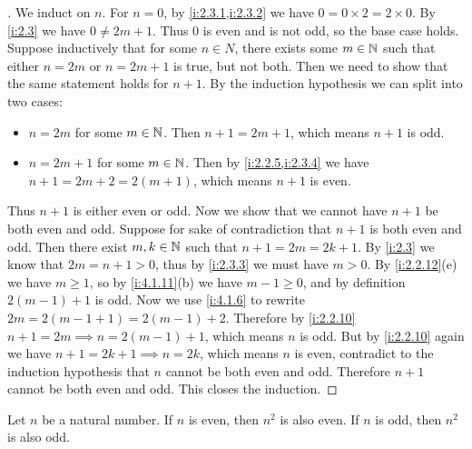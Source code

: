\begin{proof}[]
  We induct on \(n\).
  For \(n = 0\), by \cref{i:2.3.1,i:2.3.2} we have \(0 = 0 \times 2 = 2 \times 0\).
  By \cref{i:2.3} we have \(0 \neq 2m + 1\).
  Thus \(0\) is even and is not odd, so the base case holds.
  Suppose inductively that for some \(n \in N\), there exists some \(m \in \mathbb{N}\) such that either \(n = 2m\) or \(n = 2m + 1\) is true, but not both.
  Then we need to show that the same statement holds for \(n + 1\).
  By the induction hypothesis we can split into two cases:
  \begin{itemize}
    \item \(n = 2m\) for some \(m \in \mathbb{N}\).
          Then \(n + 1 = 2m + 1\), which means \(n + 1\) is odd.
    \item \(n = 2m + 1\) for some \(m \in \mathbb{N}\).
          Then by \cref{i:2.2.5,i:2.3.4} we have \(n + 1 = 2m + 2 = 2(m + 1)\), which means \(n + 1\) is even.
  \end{itemize}
  Thus \(n + 1\) is either even or odd.
  Now we show that we cannot have \(n + 1\) be both even and odd.
  Suppose for sake of contradiction that \(n + 1\) is both even and odd.
  Then there exist \(m, k \in \mathbb{N}\) such that \(n + 1 = 2m = 2k + 1\).
  By \cref{i:2.3} we know that \(2m = n + 1 > 0\), thus by \cref{i:2.3.3} we must have \(m > 0\).
  By \cref{i:2.2.12}(e) we have \(m \geq 1\), so by \cref{i:4.1.11}(b) we have \(m - 1 \geq 0\), and by definition \(2(m - 1) + 1\) is odd.
  Now we use \cref{i:4.1.6} to rewrite \(2m = 2 (m - 1 + 1) = 2 (m - 1) + 2\).
  Therefore by \cref{i:2.2.10} \(n + 1 = 2m \implies n = 2 (m - 1) + 1\), which means \(n\) is odd.
  But by \cref{i:2.2.10} again we have \(n + 1 = 2k + 1 \implies n = 2k\), which means \(n\) is even, contradict to the induction hypothesis that \(n\) cannot be both even and odd.
  Therefore \(n + 1\) cannot be both even and odd.
  This closes the induction.
\end{proof}

\begin{ac}\label{i:ac:4.4.3}
  Let \(n\) be a natural number.
  If \(n\) is even, then \(n^2\) is also even.
  If \(n\) is odd, then \(n^2\) is also odd.
\end{ac}

